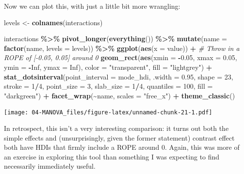\documentclass[
]{book}
\newenvironment{Shaded}{\begin{snugshade}}{\end{snugshade}}
\newcommand{\AttributeTok}[1]{\textcolor[rgb]{0.13,0.29,0.53}{#1}}
\newcommand{\CommentTok}[1]{\textcolor[rgb]{0.56,0.35,0.01}{\textit{#1}}}
\newcommand{\ConstantTok}[1]{\textcolor[rgb]{0.56,0.35,0.01}{#1}}
\newcommand{\DecValTok}[1]{\textcolor[rgb]{0.00,0.00,0.81}{#1}}
\newcommand{\FloatTok}[1]{\textcolor[rgb]{0.00,0.00,0.81}{#1}}
\newcommand{\FunctionTok}[1]{\textcolor[rgb]{0.13,0.29,0.53}{\textbf{#1}}}
\newcommand{\NormalTok}[1]{#1}
\newcommand{\OtherTok}[1]{\textcolor[rgb]{0.56,0.35,0.01}{#1}}
\newcommand{\SpecialCharTok}[1]{\textcolor[rgb]{0.81,0.36,0.00}{\textbf{#1}}}
\newcommand{\StringTok}[1]{\textcolor[rgb]{0.31,0.60,0.02}{#1}}
\begin{document}
Now we can plot this, with just a little bit more wrangling:

\begin{Shaded}
\begin{Highlighting}[]
\NormalTok{levels }\OtherTok{\textless{}{-}} \FunctionTok{colnames}\NormalTok{(interactions)}

\NormalTok{interactions }\SpecialCharTok{\%\textgreater{}\%}
  \FunctionTok{pivot\_longer}\NormalTok{(}\FunctionTok{everything}\NormalTok{()) }\SpecialCharTok{\%\textgreater{}\%}
  \FunctionTok{mutate}\NormalTok{(}\AttributeTok{name =} \FunctionTok{factor}\NormalTok{(name, }\AttributeTok{levels =}\NormalTok{ levels)) }\SpecialCharTok{\%\textgreater{}\%}
  \FunctionTok{ggplot}\NormalTok{(}\FunctionTok{aes}\NormalTok{(}\AttributeTok{x =}\NormalTok{ value)) }\SpecialCharTok{+} 
  \CommentTok{\# Throw in a ROPE of [{-}0.05, 0.05] around 0}
  \FunctionTok{geom\_rect}\NormalTok{(}\FunctionTok{aes}\NormalTok{(}\AttributeTok{xmin =} \SpecialCharTok{{-}}\FloatTok{0.05}\NormalTok{, }\AttributeTok{xmax =} \FloatTok{0.05}\NormalTok{,}
                \AttributeTok{ymin =} \SpecialCharTok{{-}}\ConstantTok{Inf}\NormalTok{, }\AttributeTok{ymax =} \ConstantTok{Inf}\NormalTok{),}
            \AttributeTok{color =} \StringTok{"transparent"}\NormalTok{, }\AttributeTok{fill =} \StringTok{"lightgrey"}\NormalTok{) }\SpecialCharTok{+} 
  \FunctionTok{stat\_dotsinterval}\NormalTok{(}\AttributeTok{point\_interval =}\NormalTok{ mode\_hdi, }\AttributeTok{.width =} \FloatTok{0.95}\NormalTok{,}
                    \AttributeTok{shape =} \DecValTok{23}\NormalTok{, }\AttributeTok{stroke =} \DecValTok{1}\SpecialCharTok{/}\DecValTok{4}\NormalTok{, }\AttributeTok{point\_size =} \DecValTok{3}\NormalTok{, }\AttributeTok{slab\_size =} \DecValTok{1}\SpecialCharTok{/}\DecValTok{4}\NormalTok{,}
                    \AttributeTok{quantiles =} \DecValTok{100}\NormalTok{, }\AttributeTok{fill =} \StringTok{"darkgreen"}\NormalTok{) }\SpecialCharTok{+}
  \FunctionTok{facet\_wrap}\NormalTok{(}\SpecialCharTok{\textasciitilde{}}\NormalTok{name, }\AttributeTok{scales =} \StringTok{"free\_x"}\NormalTok{) }\SpecialCharTok{+}
  \FunctionTok{theme\_classic}\NormalTok{()}
\end{Highlighting}
\end{Shaded}

\texttt{[image: 04-MANOVA\_files/figure-latex/unnamed-chunk-21-1.pdf]}

In retrospect, this isn't a very interesting comparison: it turns out both the simple effects and (unsurprisingly, given the former statement) contrast effect both have HDIs that firmly include a ROPE around 0. Again, this was more of an exercise in exploring this tool than something I was expecting to find necessarily immediately useful.
\end{document}
